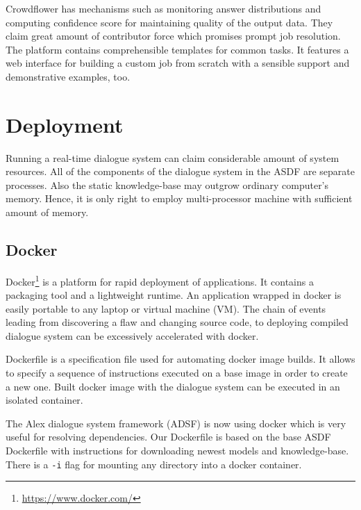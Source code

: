 Crowdflower has mechanisms such as monitoring answer distributions and computing confidence score for maintaining quality of the output data. %
They claim great amount of contributor force which promises prompt job resolution. %
The platform contains comprehensible templates for common tasks.
It features a web interface for building a custom job from scratch with a sensible support and demonstrative examples, too. %


\section{Deployment}

Running a real-time dialogue system can claim considerable amount of system resources.
All of the components of the dialogue system in the ASDF are separate processes.
Also the static knowledge-base may outgrow ordinary computer's memory.
Hence, it is only right to employ multi-processor machine with sufficient amount of memory.

\subsection{Docker}

Docker\footnote{\url{https://www.docker.com/}} is a platform for rapid deployment of applications.
It contains a packaging tool and a lightweight runtime.
An application wrapped in docker is easily portable to any laptop or virtual machine (VM).
The chain of events leading from discovering a flaw and changing source code, to deploying compiled dialogue system can be excessively accelerated with docker.

Dockerfile is a specification file used for automating docker image builds.
It allows to specify a sequence of instructions executed on a base image in order to create a new one.
Built docker image with the dialogue system can be executed in an isolated container.

The Alex dialogue system framework (ADSF) is now using docker which is very useful for resolving dependencies.
Our Dockerfile is based on the base ASDF Dockerfile with instructions for downloading newest models and knowledge-base.
There is a \texttt{-i} flag for mounting any directory into a docker container.

